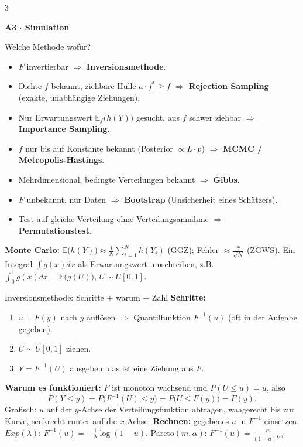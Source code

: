 \documentclass[8pt,a4paper,landscape]{extarticle}
\newcommand{\sect}[1]{\par\vspace{1pt}%
  {\fontsize{10}{11}\selectfont\bfseries #1}\par\nobreak\vspace{1pt}\nobreak}
\newcommand{\E}{\mathbb{E}}
\newcommand{\ra}{$\Rightarrow$}
\begin{document}
\newpage
\begin{multicols*}{3}
\sect{A3 $\cdot$ Simulation}
\begin{wissen}{Welche Methode wofür?}
\begin{itemize}
\item $F$ invertierbar \ra{} \textbf{Inversionsmethode}.
\item Dichte $f$ bekannt, ziehbare Hülle $a\cdot f^*\ge f$ \ra{} \textbf{Rejection Sampling} (exakte, unabhängige Ziehungen).
\item Nur Erwartungswert $\E_f\big(h(Y)\big)$ gesucht, aus $f$ schwer ziehbar \ra{} \textbf{Importance Sampling}.
\item $f$ nur bis auf Konstante bekannt (Posterior $\propto L\cdot p$) \ra{} \textbf{MCMC / Metropolis-Hastings}.
\item Mehrdimensional, bedingte Verteilungen bekannt \ra{} \textbf{Gibbs}.
\item $F$ unbekannt, nur Daten \ra{} \textbf{Bootstrap} (Unsicherheit eines Schätzers).
\item Test auf gleiche Verteilung ohne Verteilungsannahme \ra{} \textbf{Permutationstest}.
\end{itemize}
\textbf{Monte Carlo:} $\E\big(h(Y)\big)\approx\frac1N\sum_{i=1}^N h(Y_i)$ (GGZ); Fehler $\approx\frac{\hat\sigma}{\sqrt N}$ (ZGWS). Ein Integral $\int g(x)dx$ als Erwartungswert umschreiben, z.B.\ $\int_0^1 g(x)dx=\E\big(g(U)\big)$, $U\sim U[0,1]$.
\end{wissen}
\begin{rechnen}{Inversionsmethode: Schritte + warum + Zahl}
\textbf{Schritte:}
\begin{enumerate}[leftmargin=10pt]
\item $u=F(y)$ nach $y$ auflösen \ra{} Quantilfunktion $F^{-1}(u)$ (oft in der Aufgabe gegeben).
\item $U\sim U[0,1]$ ziehen.
\item $Y=F^{-1}(U)$ ausgeben; das ist eine Ziehung aus $F$.
\end{enumerate}
\textbf{Warum es funktioniert:} $F$ ist monoton wachsend und $P(U\le u)=u$, also
$$P(Y\le y)=P\big(F^{-1}(U)\le y\big)=P\big(U\le F(y)\big)=F(y).$$
Grafisch: $u$ auf der $y$-Achse der Verteilungsfunktion abtragen, waagerecht bis zur Kurve, senkrecht runter auf die $x$-Achse.
\textbf{Rechnen:} gegebenes $u$ in $F^{-1}$ einsetzen. $Exp(\lambda)$: $F^{-1}(u)=-\frac1\lambda\log(1-u)$. Pareto$(m,\alpha)$: $F^{-1}(u)=\frac{m}{(1-u)^{1/\alpha}}$.

\end{rechnen}
\end{multicols*}
\end{document}
